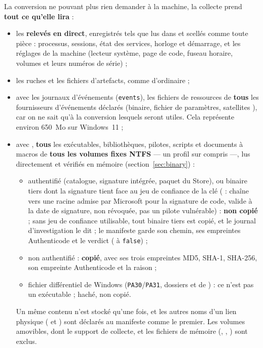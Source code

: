 \documentclass[11pt,a4paper,oneside]{report}
\begin{document}
La conversion ne pouvant plus rien demander à la machine, la collecte prend
\textbf{tout ce qu'elle lira} :
\begin{itemize}
  \item les \textbf{relevés en direct}, enregistrés tels que lus dans
         et scellés comme toute pièce :
        processus, sessions, état des services, horloge et démarrage, et les
        réglages de la machine (lecteur système, page de code, fuseau horaire,
        volumes et leurs numéros de série) ;
  \item les ruches et les fichiers d'artefacts, comme d'ordinaire ;
  \item avec les journaux d'événements (\texttt{events}), les fichiers de ressources de \textbf{tous} les
        fournisseurs d'événements déclarés (binaire, fichier de paramètres,
        satellites ), car on ne sait qu'à la conversion lesquels
        seront utiles. Cela représente environ 650~Mo sur Windows~11 ;
  \item avec , \textbf{tous} les exécutables, bibliothèques,
        pilotes, scripts et documents à macros de \textbf{tous les volumes fixes
        NTFS} — un profil sur  compris —, lus directement et
        vérifiés en mémoire (section~\ref{sec:binary}) :
        \begin{itemize}
          \item authentifié (catalogue, signature intégrée, paquet du Store), ou
                binaire tiers dont la signature tient face au jeu de confiance de
                la clé ( : chaîne vers une racine admise par
                Microsoft pour la signature de code, valide à la date de
                signature, non révoquée, pas un pilote vulnérable) :
                \textbf{non copié} ; sans jeu de confiance utilisable, tout
                binaire tiers est copié, et le journal d'investigation le dit ; le manifeste garde son chemin, ses empreintes
                Authenticode et le verdict ( à \texttt{false}) ;
          \item non authentifié : \textbf{copié}, avec ses trois empreintes
                MD5, SHA-1, SHA-256, son empreinte Authenticode et la raison ;
          \item fichier différentiel de Windows (\texttt{PA30}/\texttt{PA31},
                dossiers  et  de ) : ce n'est
                pas un exécutable ; haché, non copié.
        \end{itemize}
        Un même contenu n'est stocké qu'une fois, et les autres noms d'un lien
        physique ( et ) sont déclarés au
        manifeste comme le premier. Les volumes amovibles, dont le support de
        collecte, et les fichiers de mémoire (,
        , ) sont exclus.
\end{itemize}
\end{document}
